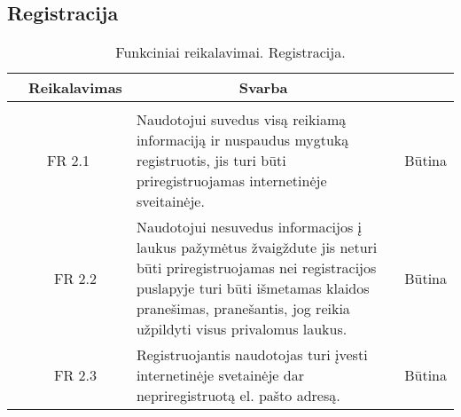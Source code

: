 \documentclass{VUMIFPSkursinis}
\begin{document}
\subsection{Registracija}
\begin{table}[H]
	\caption{Funkciniai reikalavimai. Registracija.}
	\begin{tabular}{|p{1cm}|p{1cm}|p{}|p{}|}
		\hline 
		\rowcolor{gray!50}
		\multicolumn{2}{|c|}{{\bfseries Kodas}}&
		\multicolumn{1}{c|}{{\bfseries Reikalavimas}}&
		\multicolumn{1}{c|}{{\bfseries Svarba}}\\
		\hline
		\rowcolor{lightgray}
		\multicolumn{4}{|c|}{Registracija}\\		
		
		\hline
		\multicolumn{2}{|c|}{FR 2.1}&
		{Naudotojui suvedus visą reikiamą informaciją ir nuspaudus mygtuką registruotis, jis turi būti priregistruojamas internetinėje sveitainėje.
		}&		
		\multicolumn{1}{c|}{Būtina}\\
		\hline
		\multicolumn{1}{|c}{}&
		\multicolumn{1}{c|}{FR 2.2}&
		{Naudotojui nesuvedus informacijos į laukus pažymėtus žvaigždute jis neturi būti priregistruojamas nei registracijos puslapyje turi būti išmetamas klaidos pranešimas, pranešantis, jog reikia užpildyti visus privalomus laukus.
		}&		
		\multicolumn{1}{c|}{Būtina}\\
		\hline	
		\multicolumn{1}{|c}{}&
		\multicolumn{1}{c|}{FR 2.3}&
		{Registruojantis naudotojas turi įvesti internetinėje svetainėje dar nepriregistruotą el. pašto adresą.
		}&
		\multicolumn{1}{c|}{Būtina}\\									
		\hline
	\end{tabular}		
\end{table}
\end{document}

